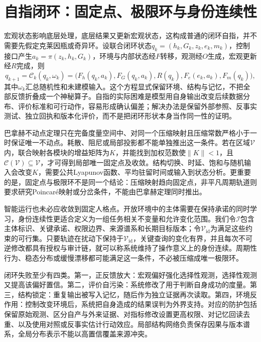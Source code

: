 \section{自指闭环：固定点、极限环与身份连续性}
\label{sec:strange_loops_and_fixed_points}

宏观状态影响底层处理，底层结果又更新宏观状态，这构成普通的闭环自指，并不需要先假定克莱因瓶或奇异环。设联合闭环状态$q_k=(h_k,G_k,z_k,e_k,m_k)$，控制接口产生$a_k=\pi(z_k,h_k,G_k)$，环境与内部状态经$F$转移，观测经$O$生成，宏观更新经$R$完成，则
\begin{equation}
 q_{k+1}=\mathcal C_k(q_k,\omega_k)
 =\bigl(F_h(q_k,a_k),F_G(q_k,a_k),R(q_k),F_e(e_k,a_k),F_m(q_k)\bigr),
\end{equation}
其中$\omega_k$汇总随机性和未建模输入。这个方程显式保留环境、结构与记忆，不把全部反馈折叠成一个神秘算子。自指的实际困难是模型用自身输出改变后续数据分布、评价标准和可行动作，容易形成确认偏差；解决办法是保留外部参照、反事实测试、独立回执和版本化评价，而不是把闭环形状本身当作同一性的证明。

巴拿赫不动点定理只在完备度量空间中、对同一个压缩映射且压缩常数严格小于一时保证唯一不动点。耗散、阻尼或局部投影都不能单独推出这一条件。若在区域$\mathcal V$内，联合映射各模块的增益矩阵为$K$，并能找到加权范数使$\|K\|<1$，且$\mathcal C(\mathcal V)\subseteq\mathcal V$，才可得到局部唯一固定点及收敛。结构切换、时延、饱和与随机输入会改变$K$，需要公共Lyapunov函数、平均驻留时间或输入到状态分析。更重要的是，固定点与极限环不是同一个结论：压缩映射趋向固定点，非平凡周期轨道则要求研究Poincar\'e映射或分岔条件，不能由巴拿赫定理同时推出。

智能运行也未必应收敛到固定人格点。开放环境中的主体需要在保持承诺的同时学习，身份连续性更适合定义为一组任务相关不变量和允许变化范围。我们令$\mathcal I$包含主体标识、关键承诺、权限边界、来源谱系和长期目标版本；令$\mathcal V_{\mathrm{id}}$为满足这些约束的可行集。只要轨迹在扰动下保持于$\mathcal V_{\mathrm{id}}$，关键查询的变化有界，并且每次不可逆修改都具有授权与审计链，就可以称系统维持了操作意义上的身份连续。周期性行为、稳态分布或缓慢漂移都可能满足这一条件，不必被压缩成唯一极限环。

闭环失败至少有四类。第一，正反馈放大：宏观偏好强化选择性观测，选择性观测又提高该偏好置信。第二，评价自污染：系统修改了用于判断自身成功的度量。第三，结构锁定：重复输出被写入记忆，随后作为独立证据再次读取。第四，环境反作用：控制改变环境后，系统把自身造成的结果误判为外界支持。对应的防护包括保留原始观测、区分自产与外来证据、对指标修改设置更高权限、对记忆回读去重、以及使用对照或反事实估计行动效应。局部结构网络负责保存因果与版本谱系，全局分布表示不能以高置信覆盖来源冲突。

